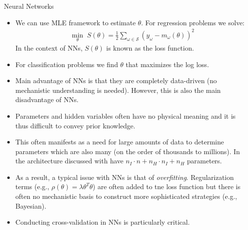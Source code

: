 \documentclass[9pt]{beamer}
\begin{document}
\begin{frame}{Neural Networks}
\begin{itemize}
\item We can use MLE framework to estimate $\theta$. For regression problems we solve:
\begin{align*}
\min_{\theta}\; S(\theta)=\frac{1}{2}\sum_{\omega\in \mathcal{S}}(y_\omega - m_\omega(\theta))^2
\end{align*}
In the context of NNs, $S(\theta)$ is known as the loss function.  
\item For classification problems we find $\theta$ that maximizes the log loss. 

\item Main advantage of NNs is that they are completely data-driven (no mechanistic understanding is needed). However, this is also the main disadvantage of NNs. 

\item Parameters and hidden variables often have no physical meaning and it is thus difficult to convey prior knowledge. 

\item This often manifests as a need for large amounts of data to determine parameters which are also many (on the order of thousands to millions). In the architecture discussed with have $n_I\cdot n+n_H\cdot n_I+n_H$ parameters.

\item As a result, a typical issue with NNs is that of {\em overfitting}.  Regularization terms (e.g., $\rho(\theta)=\lambda \theta^T\theta$) are often added to tne loss function but there is often no mechanistic basis to construct more sophisticated strategies (e.g., Bayesian). 

\item Conducting cross-validation in NNs is particularly critical. 

\end{itemize}

\end{frame}
\end{document}
